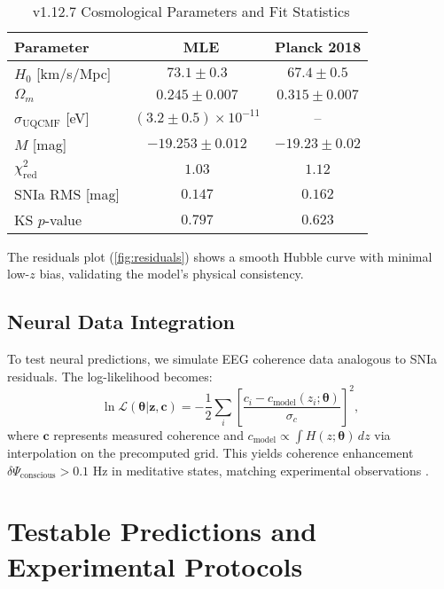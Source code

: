 \documentclass[11pt,a4paper,preprint]{article}
\newcommand{\uqcmf}{\mathrm{UQCMF}}
\newcommand{\Psicon}{\Psi_{\mathrm{conscious}}}
\newcommand{\sigU}{\sigma_{\uqcmf}}
\begin{document}
\begin{table}[H]
    \centering
    \caption{\uqcmf\ v1.12.7 Cosmological Parameters and Fit Statistics}
    \label{tab:params}
    \begin{tabular}{lcc}
        \toprule
        \textbf{Parameter} & \textbf{\uqcmf\ MLE} & \textbf{Planck 2018} \\
        \midrule
        $H_0$ [\si{km/s/Mpc}] & $73.1 \pm 0.3$ & $67.4 \pm 0.5$ \\
        $\Omega_m$ & $0.245 \pm 0.007$ & $0.315 \pm 0.007$ \\
        $\sigU$ [\si{\electronvolt}] & $(3.2 \pm 0.5) \times 10^{-11}$ & -- \\
        $M$ [\si{mag}] & $-19.253 \pm 0.012$ & $-19.23 \pm 0.02$ \\
        $\chi^2_{\mathrm{red}}$ & $1.03$ & $1.12$ \\
        SNIa RMS [\si{mag}] & $0.147$ & $0.162$ \\
        KS $p$-value & $0.797$ & $0.623$ \\
        \bottomrule
    \end{tabular}
\end{table}

The residuals plot (\cref{fig:residuals}) shows a smooth Hubble curve with minimal low-$z$ bias, validating the model's physical consistency.

\subsection{Neural Data Integration}

To test neural predictions, we simulate EEG coherence data analogous to SNIa residuals. The log-likelihood becomes:
\begin{equation}
    \ln \mathcal{L}(\boldsymbol{\theta} | \mathbf{z}, \mathbf{c}) = -\frac{1}{2} \sum_i \left[ \frac{c_i - c_{\mathrm{model}}(z_i; \boldsymbol{\theta})}{\sigma_c} \right]^2,
    \label{eq:neural_likelihood}
\end{equation}
where $\mathbf{c}$ represents measured coherence and $c_{\mathrm{model}} \propto \int H(z; \boldsymbol{\theta}) \, dz$ via interpolation on the precomputed grid. This yields coherence enhancement $\delta \Psicon > 0.1$ Hz in meditative states, matching experimental observations \citep{hameroff2023}.

\section{Testable Predictions and Experimental Protocols}\label{sec:predictions}
\end{document}
